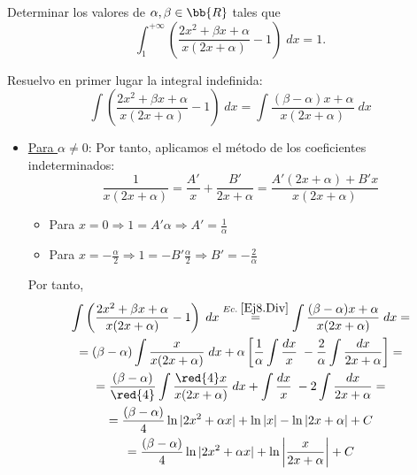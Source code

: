 \begin{ejercicio}
    Determinar los valores de $\alpha,\beta\in \bb{R}$ tales que
    \begin{equation*}
        \int_1^{+\infty} \left(\frac{2x^2+\beta x+\alpha}{x(2x+\alpha)}-1\right)\;dx = 1.
    \end{equation*}

    Resuelvo en primer lugar la integral indefinida:
    \begin{equation*}\label{Ej8.Div}
        \int \left(\frac{2x^2+\beta x+\alpha}{x(2x+\alpha)}-1\right)\;dx
        =
        \int \frac{(\beta-\alpha)x + \alpha}{x(2x+\alpha)}\;dx
    \end{equation*}
    

    \begin{itemize}
        \item \underline{Para $\alpha\neq 0$}:
        Por tanto, aplicamos el método de los coeficientes indeterminados:
        \begin{equation*}
            \frac{1}{x(2x+\alpha)} = \frac{A'}{x} + \frac{B'}{2x+\alpha} = \frac{A'(2x+\alpha) +B'x}{x(2x+\alpha)}
        \end{equation*}
        \begin{itemize}
            \item Para $x=0\Longrightarrow 1 = A'\alpha \Longrightarrow A'=\frac{1}{\alpha}$
            \item Para $x=-\frac{\alpha}{2}\Longrightarrow 1=-B'\frac{\alpha}{2} \Longrightarrow B'=-\frac{2}{\alpha}$
        \end{itemize}
        Por tanto,
        \begin{multline*}
            \int \left(\frac{2x^2+\beta x+\alpha}{x(2x+\alpha)}-1\right)\;dx
            \stackrel{Ec.\;\ref{Ej8.Div}}{=}
            \int \frac{(\beta-\alpha)x + \alpha}{x(2x+\alpha)}\;dx
            =\\= (\beta - \alpha)\int \frac{x}{x(2x + \alpha)}\;dx +\alpha \left[\frac{1}{\alpha}\int \frac{dx}{x}\; -\frac{2}{\alpha}\int \frac{dx}{2x+\alpha}\right] =
            \\= \frac{(\beta-\alpha)}{\red{4}} \int \frac{\red{4}x}{x(2x + \alpha)}\;dx +\int \frac{dx}{x}\; -2\int \frac{dx}{2x+\alpha} =
            \\= \frac{(\beta-\alpha)}{4}\ln |2x^2+\alpha x| +\ln |x| - \ln |2x+\alpha| + C
            \\= \frac{(\beta-\alpha)}{4}\ln |2x^2+\alpha x| +\ln \left|\frac{x}{2x+\alpha}\right| + C
        \end{multline*}
        

\end{itemize}
\end{ejercicio}
